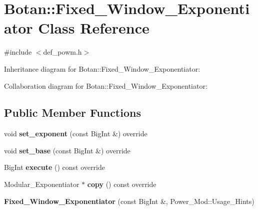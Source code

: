 \hypertarget{class_botan_1_1_fixed___window___exponentiator}{}\section{Botan\+:\+:Fixed\+\_\+\+Window\+\_\+\+Exponentiator Class Reference}
\label{class_botan_1_1_fixed___window___exponentiator}


{\ttfamily \#include $<$def\+\_\+powm.\+h$>$}



Inheritance diagram for Botan\+:\+:Fixed\+\_\+\+Window\+\_\+\+Exponentiator\+:


Collaboration diagram for Botan\+:\+:Fixed\+\_\+\+Window\+\_\+\+Exponentiator\+:
\subsection*{Public Member Functions}
\begin{DoxyCompactItemize}
\item 
\mbox{\label{class_botan_1_1_fixed___window___exponentiator_a6a9f3941697882e887da40da2066a4de}} 
void {\bfseries set\+\_\+exponent} (const Big\+Int \&) override
\item 
\mbox{\label{class_botan_1_1_fixed___window___exponentiator_a8fe07a70ce3ee29d24d9e3ef3d95f200}} 
void {\bfseries set\+\_\+base} (const Big\+Int \&) override
\item 
\mbox{\label{class_botan_1_1_fixed___window___exponentiator_a6ee85e91fc62dea567bd9c28b88a641c}} 
Big\+Int {\bfseries execute} () const override
\item 
\mbox{\label{class_botan_1_1_fixed___window___exponentiator_a70fd3218ee5e77efd553dfddf7c249c0}} 
Modular\+\_\+\+Exponentiator $\ast$ {\bfseries copy} () const override
\item 
\mbox{\label{class_botan_1_1_fixed___window___exponentiator_a2d5e70193e06ebebe869a74d2e09b061}} 
{\bfseries Fixed\+\_\+\+Window\+\_\+\+Exponentiator} (const Big\+Int \&, Power\+\_\+\+Mod\+::\+Usage\+\_\+\+Hints)
\end{DoxyCompactItemize}


